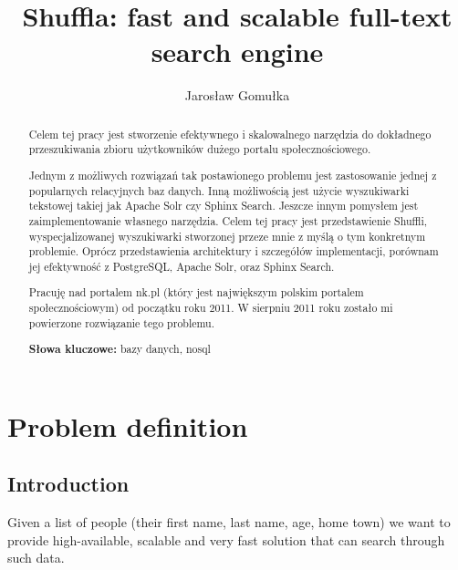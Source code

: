 \documentclass[10pt,a4paper]{article}
\begin{document}
\normalsize

\restoregeometry

\newpage
\thispagestyle{empty}

\begin{abstract}
Celem tej pracy jest stworzenie efektywnego i skalowalnego narzędzia do dokładnego przeszukiwania zbioru użytkowników dużego portalu społecznościowego. 

Jednym z możliwych rozwiązań tak postawionego problemu jest zastosowanie jednej z popularnych relacyjnych baz danych. Inną możliwością jest użycie wyszukiwarki tekstowej takiej jak Apache Solr czy Sphinx Search. Jeszcze innym pomysłem jest zaimplementowanie własnego narzędzia. Celem tej pracy jest przedstawienie Shuffli, wyspecjalizowanej wyszukiwarki stworzonej przeze mnie z myślą o tym konkretnym problemie. Oprócz przedstawienia architektury i szczegółów implementacji, porównam jej efektywność z PostgreSQL, Apache Solr, oraz Sphinx Search.

\bigskip
Pracuję nad portalem nk.pl (który jest największym polskim portalem społecznościowym) od początku roku 2011. W sierpniu 2011 roku zostało mi powierzone rozwiązanie tego problemu.

\bigskip
\noindent \textbf{Słowa kluczowe:} bazy danych, nosql
\end{abstract}



\title{Shuffla: fast and scalable full-text search engine}
\author{Jarosław Gomułka}

\maketitle


\section{Problem definition}

\subsection{Introduction}
Given a list of people (their first name, last name, age, home town) we want to provide high-available, scalable and very fast solution that can search through such data.
\end{document}
